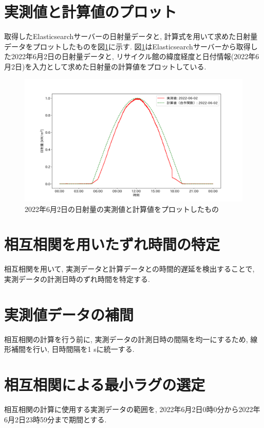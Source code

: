 
\section{実測値と計算値のプロット}
取得したElasticsearchサーバーの日射量データと, 計算式を用いて求めた日射量データをプロットしたものを図\ref{20220529-p1}に示す.
図\ref{20220529-p1}はElasticsearchサーバーから取得した2022年6月2日の日射量データと, リサイクル館の緯度経度と日付情報(2022年6月2日)を入力として求めた日射量の計算値をプロットしている.

\begin{figure}
  \begin{center}
    \includegraphics[width=160mm]{sotu/figure/2/original-20220602-corr.png}
    \caption{2022年6月2日の日射量の実測値と計算値をプロットしたもの}
    \label{20220529-p1}
  \end{center}
\end{figure}


\section{相互相関を用いたずれ時間の特定}
相互相関を用いて, 実測データと計算データとの時間的遅延を検出することで, 実測データの計測日時のずれ時間を特定する.

\section{実測値データの補間}
相互相関の計算を行う前に, 実測データの計測日時の間隔を均一にするため, 線形補間を行い, 日時間隔を1 \si{\second}に統一する.

\section{相互相関による最小ラグの選定}
相互相関の計算に使用する実測データの範囲を, 2022年6月2日0時0分から2022年6月2日23時59分まで期間とする.

